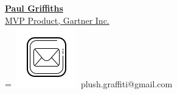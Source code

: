 \documentclass[]{main}
\begin{document}
\begin{paracol}{2}
\vspace{1em}
\href{https://www.linkedin.com/in/paul-griffiths-bcn/}{\textbf{Paul Griffiths} \\MVP Product, Gartner Inc.}
\\
\begingroup
{}=\hbox{
\includegraphics[scale=0.2,trim={1cm 1.2cm 1.2cm 0cm}]{images/icons/mail.png}\hspace{0.3cm} plush.graffiti@gmail.com
}
\parbox{\wd0}{}
\endgroup
\\






\end{paracol}
\end{document}
